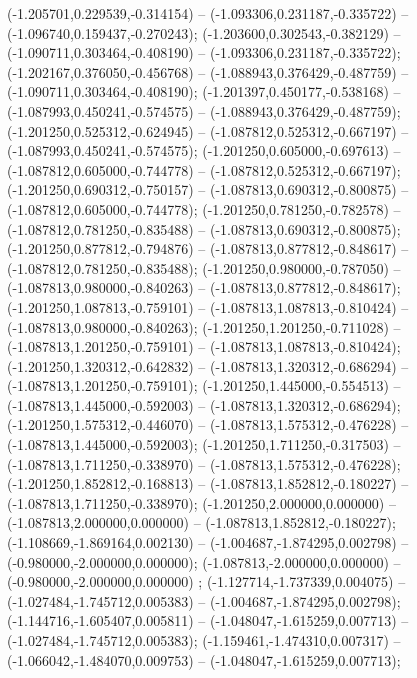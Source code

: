  (-1.205701,0.229539,-0.314154) -- (-1.093306,0.231187,-0.335722) -- (-1.096740,0.159437,-0.270243);
 (-1.203600,0.302543,-0.382129) -- (-1.090711,0.303464,-0.408190) -- (-1.093306,0.231187,-0.335722);
 (-1.202167,0.376050,-0.456768) -- (-1.088943,0.376429,-0.487759) -- (-1.090711,0.303464,-0.408190);
 (-1.201397,0.450177,-0.538168) -- (-1.087993,0.450241,-0.574575) -- (-1.088943,0.376429,-0.487759);
 (-1.201250,0.525312,-0.624945) -- (-1.087812,0.525312,-0.667197) -- (-1.087993,0.450241,-0.574575);
 (-1.201250,0.605000,-0.697613) -- (-1.087812,0.605000,-0.744778) -- (-1.087812,0.525312,-0.667197);
 (-1.201250,0.690312,-0.750157) -- (-1.087813,0.690312,-0.800875) -- (-1.087812,0.605000,-0.744778);
 (-1.201250,0.781250,-0.782578) -- (-1.087812,0.781250,-0.835488) -- (-1.087813,0.690312,-0.800875);
 (-1.201250,0.877812,-0.794876) -- (-1.087813,0.877812,-0.848617) -- (-1.087812,0.781250,-0.835488);
 (-1.201250,0.980000,-0.787050) -- (-1.087813,0.980000,-0.840263) -- (-1.087813,0.877812,-0.848617);
 (-1.201250,1.087813,-0.759101) -- (-1.087813,1.087813,-0.810424) -- (-1.087813,0.980000,-0.840263);
 (-1.201250,1.201250,-0.711028) -- (-1.087813,1.201250,-0.759101) -- (-1.087813,1.087813,-0.810424);
 (-1.201250,1.320312,-0.642832) -- (-1.087813,1.320312,-0.686294) -- (-1.087813,1.201250,-0.759101);
 (-1.201250,1.445000,-0.554513) -- (-1.087813,1.445000,-0.592003) -- (-1.087813,1.320312,-0.686294);
 (-1.201250,1.575312,-0.446070) -- (-1.087813,1.575312,-0.476228) -- (-1.087813,1.445000,-0.592003);
 (-1.201250,1.711250,-0.317503) -- (-1.087813,1.711250,-0.338970) -- (-1.087813,1.575312,-0.476228);
 (-1.201250,1.852812,-0.168813) -- (-1.087813,1.852812,-0.180227) -- (-1.087813,1.711250,-0.338970);
 (-1.201250,2.000000,0.000000) -- (-1.087813,2.000000,0.000000) -- (-1.087813,1.852812,-0.180227);
 (-1.108669,-1.869164,0.002130) -- (-1.004687,-1.874295,0.002798) -- (-0.980000,-2.000000,0.000000);
 (-1.087813,-2.000000,0.000000) -- (-0.980000,-2.000000,0.000000) ;
 (-1.127714,-1.737339,0.004075) -- (-1.027484,-1.745712,0.005383) -- (-1.004687,-1.874295,0.002798);
 (-1.144716,-1.605407,0.005811) -- (-1.048047,-1.615259,0.007713) -- (-1.027484,-1.745712,0.005383);
 (-1.159461,-1.474310,0.007317) -- (-1.066042,-1.484070,0.009753) -- (-1.048047,-1.615259,0.007713);
